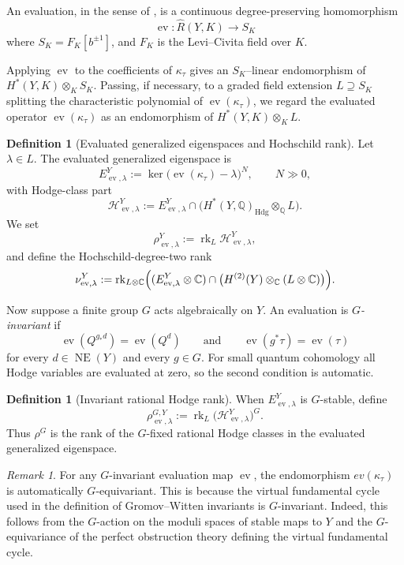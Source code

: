 \documentclass{amsart}
\theoremstyle{definition}
\newtheorem{definition}[theorem]{Definition}
\theoremstyle{remark}
\newtheorem{remark}[theorem]{Remark}
\newcommand{\CC}{\mathbb C}
\newcommand{\QQ}{\mathbb Q}
\newcommand{\HH}{\mathcal H}
\newcommand{\NE}{\operatorname{NE}}
\newcommand{\Hdg}{\mathrm{Hdg}}
\newcommand{\rk}{\operatorname{rk}}
\newcommand{\ev}{\operatorname{ev}}
\begin{document}
An evaluation, in the sense of \cite[Definition~20]{guere2026irrationality},
is a continuous degree-preserving homomorphism
\[
  \ev:\widehat R(Y,K)\longrightarrow S_{K}
\]
where \(S_K=F_K[b^{\pm1}]\), and \(F_K\) is the Levi--Civita field over \(K\).

Applying \(\ev\) to the coefficients of
\(\kappa_\tau\) gives an \(S_{K}\)--linear endomorphism of \(H^*(Y,K)\otimes_K S_{K}\).
Passing, if necessary, to a graded field extension \(L\supseteq S_{K}\) splitting
the characteristic polynomial of \(\ev(\kappa_\tau)\), we regard the evaluated
operator \(\ev(\kappa_\tau)\) as an endomorphism of \(H^*(Y,K)\otimes_K L\).

\begin{definition}[Evaluated generalized eigenspaces and Hochschild rank]
\label{def:evaluated-ranks}
Let \(\lambda\in L\). The evaluated generalized eigenspace is
\[
  E^Y_{\ev,\lambda}:=\ker\bigl(\ev(\kappa_\tau)-\lambda\bigr)^N,\qquad N\gg0,
\]
with Hodge-class part
\[
  \HH^Y_{\ev,\lambda}
  :=E^Y_{\ev,\lambda}\cap\bigl(H^*(Y,\QQ)_{\Hdg}\otimes_\QQ L\bigr).
\]
We set
\[
  \rho^Y_{\ev,\lambda}:=\rk_{L}\HH^Y_{\ev,\lambda},
\]
and define the Hochschild-degree-two rank
\[
  \nu^Y_{\ev,\lambda}
  :=\rk_{L\otimes\CC}
  \Bigl((E^Y_{\ev,\lambda}\otimes\CC)\cap
        \bigl(H^{(2)}(Y)\otimes_\CC(L\otimes\CC)\bigr)\Bigr).
\]
\end{definition}
Now suppose a finite group \(G\) acts algebraically on \(Y\). An evaluation is
\emph{\(G\)-invariant} if
\[
  \ev(Q^{g_*d})=\ev(Q^{d})\qquad\text{and}\qquad\ev(g^*\tau)=\ev(\tau)
\]
for every \(d\in\NE(Y)\) and every \(g\in G\). For small quantum cohomology all
Hodge variables are evaluated at zero, so the second condition is automatic.

\begin{definition}[Invariant rational Hodge rank]
\label{def:rhoG}
When \(E^Y_{\ev,\lambda}\) is \(G\)-stable, define
\[
  \rho^{G,Y}_{\ev,\lambda}:=\rk_{L}\bigl(\HH^Y_{\ev,\lambda}\bigr)^G.
\]
Thus \(\rho^{G}\) is the rank of the \(G\)-fixed rational Hodge classes in the
evaluated generalized eigenspace.
\end{definition}

\begin{remark}
For any $G$-invariant evaluation map $\ev$, the endomorphism $ev(\kappa_\tau)$ is
automatically $G$-equivariant. This is because the
virtual fundamental cycle used in the definition of
Gromov--Witten invariants is $G$-invariant.
Indeed, this follows from the $G$-action on the moduli
spaces of stable maps to $Y$ and the $G$-equivariance
of the perfect obstruction theory defining the virtual 
fundamental cycle.
\end{remark}
\end{document}
